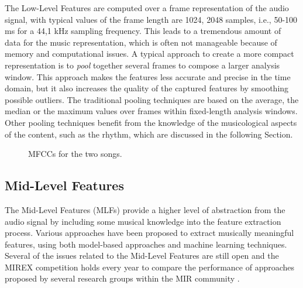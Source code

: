 The Low-Level Features are computed over a frame representation of the audio signal, with typical values of the frame length are 1024, 2048 samples, i.e., 50-100 ms for a 44,1 kHz sampling frequency. This leads to a tremendous amount of data for the music representation, which is often not manageable because of memory and computational issues. A typical approach to create a more compact representation is to \textit{pool} together several frames to compose a larger analysis window. This approach makes the features less accurate and precise in the time domain, but it also increases the quality of the captured features by smoothing possible outliers. The traditional pooling techniques are based on the average, the median or the maximum values over frames within fixed-length analysis windows. Other pooling techniques benefit from the knowledge of the musicological aspects of the content, such as the rhythm, which are discussed in the following Section.


\begin{figure}[tb]
        \centering
       \hfil
      \caption{MFCCs for the two songs.}
      \label{fig:LLFs:mfcc}          
\end{figure}


\subsection{Mid-Level Features}\label{sec:LLFs:MLFs}
The Mid-Level Features (MLFs) provide a higher level of abstraction from the audio signal by including some musical knowledge into the feature extraction process. Various approaches have been proposed to extract musically meaningful features, using both model-based approaches and machine learning techniques. Several of the issues related to the Mid-Level Features are still open and the MIREX competition holds every year to compare the performance of approaches proposed by several research groups within the MIR community \cite{downie2014ten}.

